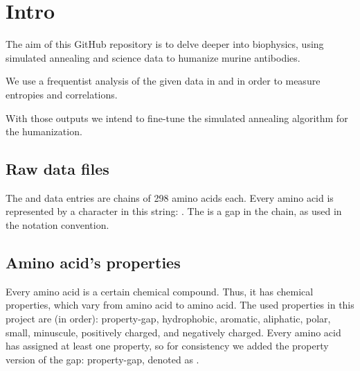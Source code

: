 \section{Intro}

The aim of this GitHub repository is to delve deeper into biophysics, using simulated annealing and science data to humanize murine antibodies.

We use a frequentist analysis of the given data in  and  in order to measure entropies and correlations. 

With those outputs we intend to fine-tune the simulated annealing algorithm for the humanization.

\subsection{Raw data files} 
The  and  data entries are chains of 298 amino acids each. Every amino acid is represented by a character in this string:
\code{\textcolor{green!70!black}{-ACDEFGHIKLMNPQRSTVWY}}. The \code{\textcolor{green!70!black}{-}} is a gap in the chain, as used in the notation convention.

\subsection{Amino acid's properties}
Every amino acid is a certain chemical compound. Thus, it has chemical properties, which vary from amino acid to amino acid. The used properties in this project are (in order): property-gap, hydrophobic, aromatic, aliphatic, polar, small, minuscule, positively charged, and negatively charged. Every amino acid has assigned at least one property, so for consistency we added the property version of the gap: property-gap, denoted as \code{\textcolor{green!70!black}{-(PROP)}}.